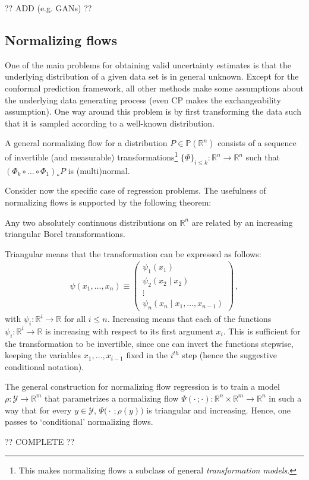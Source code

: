     ?? ADD (e.g. GANs) ??

\subsection{Normalizing flows}

    One of the main problems for obtaining valid uncertainty estimates is that the underlying distribution of a given data set is in general unknown. Except for the conformal prediction framework, all other methods make some assumptions about the underlying data generating process (even CP makes the exchangeability assumption). One way around this problem is by first transforming the data such that it is sampled according to a well-known distribution.

    A general normalizing flow for a distribution $P\in\mathbb{P}(\mathbb{R}^n)$ consists of a sequence of invertible (and measurable) transformations\footnote{This makes normalizing flows a subclass of general \textit{transformation models}.} $\{\Phi\}_{i\leq k}:\mathbb{R}^n\rightarrow\mathbb{R}^n$ such that $(\Phi_k\circ\ldots\circ\Phi_1)_*P$ is (multi)normal.

    Consider now the specific case of regression problems. The usefulness of normalizing flows is supported by the following theorem:
    \begin{theorem}
        Any two absolutely continuous distributions on $\mathbb{R}^n$ are related by an increasing triangular Borel transformations.
    \end{theorem}
    Triangular means that the transformation can be expressed as follows:
    \begin{gather}
        \psi(x_1,\ldots,x_n)\equiv
        \begin{pmatrix}
            \psi_1(x_1)\\
            \psi_2(x_2\mid x_2)\\
            \vdots\\
            \psi_n(x_n\mid x_1,\ldots,x_{n-1})
        \end{pmatrix}\,,
    \end{gather}
    with $\psi_i:\mathbb{R}^i\rightarrow\mathbb{R}$ for all $i\leq n$. Increasing means that each of the functions $\psi_i:\mathbb{R}^i\rightarrow\mathbb{R}$ is increasing with respect to its first argument $x_i$. This is sufficient for the transformation to be invertible, since one can invert the functions stepwise, keeping the variables $x_1,\ldots,x_{i-1}$ fixed in the $i^{th}$ step (hence the suggestive conditional notation).

    The general construction for normalizing flow regression is to train a model $\rho:\mathcal{Y}\rightarrow\mathbb{R}^m$ that parametrizes a normalizing flow $\Psi(\cdot\,;\cdot):\mathbb{R}^n\times\mathbb{R}^m\rightarrow\mathbb{R}^n$ in such a way that for every $y\in\mathcal{Y}$, $\Psi\bigl(\cdot\,;\rho(y)\bigr)$ is triangular and increasing. Hence, one passes to `conditional' normalizing flows.

    ?? COMPLETE ??